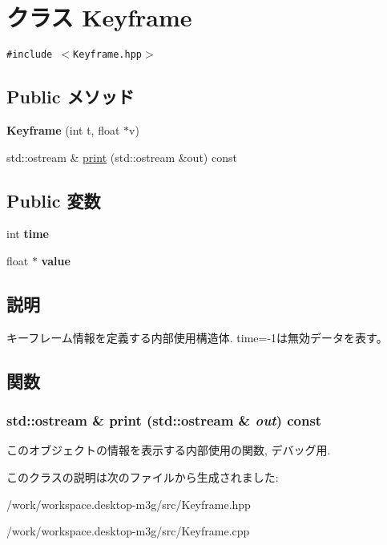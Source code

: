 \hypertarget{classm3g_1_1Keyframe}{
\section{クラス Keyframe}
\label{classm3g_1_1Keyframe}
}
{\tt \#include $<$Keyframe.hpp$>$}

\subsection*{Public メソッド}
\begin{CompactItemize}
\item 
\hypertarget{classm3g_1_1Keyframe_8d7b239b0b22e155001b100c80a9680b}{
\textbf{Keyframe} (int t, float $\ast$v)}
\label{classm3g_1_1Keyframe_8d7b239b0b22e155001b100c80a9680b}

\item 
std::ostream \& \hyperlink{classm3g_1_1Keyframe_6fea17fa1532df3794f8cb39cb4f911f}{print} (std::ostream \&out) const 
\end{CompactItemize}
\subsection*{Public 変数}
\begin{CompactItemize}
\item 
\hypertarget{classm3g_1_1Keyframe_42715f65f02da52edc5b22021d8ae670}{
int \textbf{time}}
\label{classm3g_1_1Keyframe_42715f65f02da52edc5b22021d8ae670}

\item 
\hypertarget{classm3g_1_1Keyframe_b8d14ba2f5911cadc861b9b89ae0c605}{
float $\ast$ \textbf{value}}
\label{classm3g_1_1Keyframe_b8d14ba2f5911cadc861b9b89ae0c605}

\end{CompactItemize}


\subsection{説明}
キーフレーム情報を定義する内部使用構造体. time=-1は無効データを表す。 

\subsection{関数}
\hypertarget{classm3g_1_1Keyframe_6fea17fa1532df3794f8cb39cb4f911f}{
\subsubsection[{print}]{\setlength{\rightskip}{0pt plus 5cm}std::ostream \& print (std::ostream \& {\em out}) const}}
\label{classm3g_1_1Keyframe_6fea17fa1532df3794f8cb39cb4f911f}


このオブジェクトの情報を表示する内部使用の関数, デバッグ用. 

このクラスの説明は次のファイルから生成されました:\begin{CompactItemize}
\item 
/work/workspace.desktop-m3g/src/Keyframe.hpp\item 
/work/workspace.desktop-m3g/src/Keyframe.cpp\end{CompactItemize}
